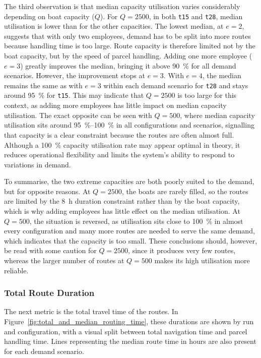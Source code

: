 \documentclass[12pt]{article}
\begin{document}
The third observation is that median capacity utilisation varies considerably depending on boat capacity (\(Q\)). For \(Q=2500\), in both \texttt{t15} and \texttt{t28}, median utilisation is lower than for the other capacities. The lowest median, at \(e=2\), suggests that with only two employees, demand has to be split into more routes because handling time is too large. Route capacity is therefore limited not by the boat capacity, but by the speed of parcel handling. Adding one more employee (\(e=3\)) greatly improves the median, bringing it above \qty{90}{\percent} for all demand scenarios. However, the improvement stops at \(e=3\). With \(e=4\), the median remains the same as with \(e=3\) within each demand scenario for \texttt{t28} and stays around \qty{95}{\percent} for \texttt{t15}. This may indicate that \(Q=2500\) is too large for this context, as adding more employees has little impact on median capacity utilisation. The exact opposite can be seen with \(Q=500\), where median capacity utilisation sits around \qtyrange{95}{100}{\percent} in all configurations and scenarios, signalling that capacity is a clear constraint because the routes are often almost full. Although a \qty{100}{\percent} capacity utilisation rate may appear optimal in theory, it reduces operational flexibility and limits the system's ability to respond to variations in demand.

To summarise, the two extreme capacities are both poorly suited to the demand, but for opposite reasons. At \(Q=2500\), the boats are rarely filled, so the routes are limited by the \qty{8}{\hour} duration constraint rather than by the boat capacity, which is why adding employees has little effect on the median utilisation. At \(Q=500\), the situation is reversed, as utilisation sits close to \qty{100}{\percent} in almost every configuration and many more routes are needed to serve the same demand, which indicates that the capacity is too small. These conclusions should, however, be read with some caution for \(Q=2500\), since it produces very few routes, whereas the larger number of routes at \(Q=500\) makes its high utilisation more reliable.

\subsubsection{Total Route Duration}
\label{subsubsec:total-route-duration}

The next metric is the total travel time of the routes. In Figure~\ref{fig:total_and_median_routing_time}, these durations are shown by run and configuration, with a visual split between total navigation time and parcel handling time. Lines representing the median route time in hours are also present for each demand scenario.
\end{document}
